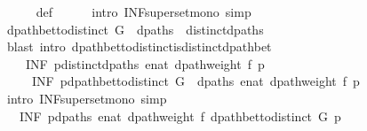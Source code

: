 \begin{isabellebody}
\ \ \ \ \isamarkupfalse%
\ {\isasymdelta}{\isacharunderscore}{\kern0pt}def\isanewline
\ \ \ \ \isamarkupfalse%
\ {\isacharparenleft}{\kern0pt}intro\ INF{\isacharunderscore}{\kern0pt}superset{\isacharunderscore}{\kern0pt}mono{\isacharparenright}{\kern0pt}\ simp{\isacharplus}{\kern0pt}\isanewline
\isanewline
\ \ \isamarkupfalse%
\ {\isachardoublequoteopen}dpath{\isacharunderscore}{\kern0pt}bet{\isacharunderscore}{\kern0pt}to{\isacharunderscore}{\kern0pt}distinct\ G\ {\isacharbackquote}{\kern0pt}\ {\isacharquery}{\kern0pt}dpaths\ {\isasymsubseteq}\ {\isacharquery}{\kern0pt}distinct{\isacharunderscore}{\kern0pt}dpaths{\isachardoublequoteclose}\isanewline
\ \ \ \ \isamarkupfalse%
\ {\isacharparenleft}{\kern0pt}blast\ intro{\isacharcolon}{\kern0pt}\ dpath{\isacharunderscore}{\kern0pt}bet{\isacharunderscore}{\kern0pt}to{\isacharunderscore}{\kern0pt}distinct{\isacharunderscore}{\kern0pt}is{\isacharunderscore}{\kern0pt}distinct{\isacharunderscore}{\kern0pt}dpath{\isacharunderscore}{\kern0pt}bet{\isacharparenright}{\kern0pt}\isanewline
\ \ \isamarkupfalse%
\isanewline
\ \ \ \ {\isachardoublequoteopen}{\isacharparenleft}{\kern0pt}INF\ p{\isasymin}{\isacharquery}{\kern0pt}distinct{\isacharunderscore}{\kern0pt}dpaths{\isachardot}{\kern0pt}\ enat\ {\isacharparenleft}{\kern0pt}dpath{\isacharunderscore}{\kern0pt}weight\ f\ p{\isacharparenright}{\kern0pt}{\isacharparenright}{\kern0pt}\ {\isasymle}\isanewline
\ \ \ \ \ {\isacharparenleft}{\kern0pt}INF\ p{\isasymin}dpath{\isacharunderscore}{\kern0pt}bet{\isacharunderscore}{\kern0pt}to{\isacharunderscore}{\kern0pt}distinct\ G\ {\isacharbackquote}{\kern0pt}\ {\isacharquery}{\kern0pt}dpaths{\isachardot}{\kern0pt}\ enat\ {\isacharparenleft}{\kern0pt}dpath{\isacharunderscore}{\kern0pt}weight\ f\ p{\isacharparenright}{\kern0pt}{\isacharparenright}{\kern0pt}{\isachardoublequoteclose}\isanewline
\ \ \ \ \isamarkupfalse%
\ {\isacharparenleft}{\kern0pt}intro\ INF{\isacharunderscore}{\kern0pt}superset{\isacharunderscore}{\kern0pt}mono{\isacharparenright}{\kern0pt}\ simp{\isacharplus}{\kern0pt}\isanewline
\ \ \isamarkupfalse%
\ \isamarkupfalse%
\ {\isachardoublequoteopen}{\isachardot}{\kern0pt}{\isachardot}{\kern0pt}{\isachardot}{\kern0pt}\ {\isacharequal}{\kern0pt}\ {\isacharparenleft}{\kern0pt}INF\ p{\isasymin}{\isacharquery}{\kern0pt}dpaths{\isachardot}{\kern0pt}\ enat\ {\isacharparenleft}{\kern0pt}dpath{\isacharunderscore}{\kern0pt}weight\ f\ {\isacharparenleft}{\kern0pt}dpath{\isacharunderscore}{\kern0pt}bet{\isacharunderscore}{\kern0pt}to{\isacharunderscore}{\kern0pt}distinct\ G\ p{\isacharparenright}{\kern0pt}{\isacharparenright}{\kern0pt}{\isacharparenright}{\kern0pt}{\isachardoublequoteclose}\isanewline

\end{isabellebody}

